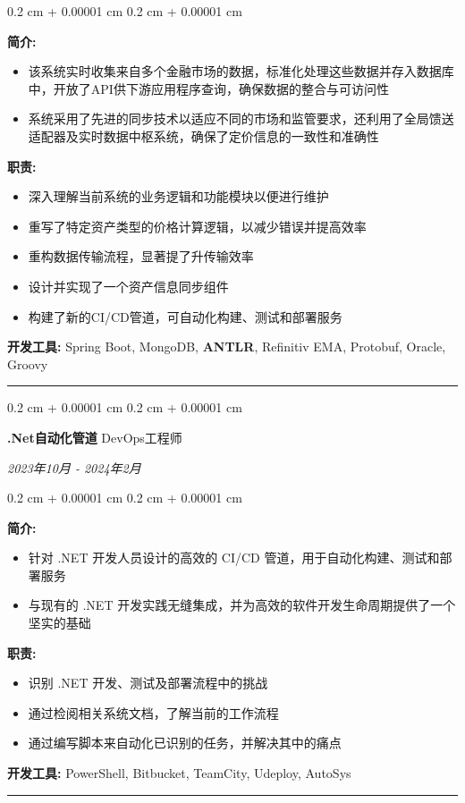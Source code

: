\documentclass[10pt, letterpaper]{article}
\newenvironment{highlights}{
	\begin{itemize}[
		topsep=0.10 cm,
		parsep=0.10 cm,
		partopsep=0pt,
		itemsep=0pt,
		leftmargin=0.4 cm + 10pt
		]
	}{
	\end{itemize}
} %
\newenvironment{onecolentry}{
	\begin{adjustwidth}{
			0.2 cm + 0.00001 cm
		}{
			0.2 cm + 0.00001 cm
		}
	}{
	\end{adjustwidth}
} %
\newenvironment{twocolentry}[2][]{
	\onecolentry
	\def\secondColumn{#2}
	\setcolumnwidth{\fill, 4.5 cm}
	\begin{paracol}{2}
	}{
		\switchcolumn \raggedleft \secondColumn
	\end{paracol}
	\endonecolentry
} %
\begin{document}
		\vspace{0.10 cm}
		\begin{onecolentry}
			\textbf{简介:} 
			\begin{highlights}
				\item{该系统实时收集来自多个金融市场的数据，标准化处理这些数据并存入数据库中，开放了API供下游应用程序查询，确保数据的整合与可访问性}
				\item {系统采用了先进的同步技术以适应不同的市场和监管要求，还利用了全局馈送适配器及实时数据中枢系统，确保了定价信息的一致性和准确性}
			\end{highlights}
 			\textbf{职责:} 
			\begin{highlights}
				\item{深入理解当前系统的业务逻辑和功能模块以便进行维护}
				\item{重写了特定资产类型的价格计算逻辑，以减少错误并提高效率}
				\item{重构数据传输流程，显著提了升传输效率}
				\item{设计并实现了一个资产信息同步组件}
				\item{构建了新的CI/CD管道，可自动化构建、测试和部署服务}
			\end{highlights}
			\textbf{开发工具:} Spring Boot, MongoDB, \textbf{ANTLR}, Refinitiv EMA, Protobuf, Oracle, Groovy
		\end{onecolentry}		
		\vspace{0.4 cm}
		\hrule
		\vspace{0.4 cm}
		\begin{twocolentry}{
				\textit{2023年10月 - 2024年2月}}
				\textbf{.Net自动化管道}
				\space\space\space\space\space\space\space\space\space\space\space\space DevOps工程师
			\end{twocolentry}
			
			\vspace{0.10 cm}
			\begin{onecolentry}
				\textbf{简介:} 
				\begin{highlights}
					\item{针对 .NET 开发人员设计的高效的 CI/CD 管道，用于自动化构建、测试和部署服务}
					\item{与现有的 .NET 开发实践无缝集成，并为高效的软件开发生命周期提供了一个坚实的基础}
				\end{highlights}
				\textbf{职责:} 
				\begin{highlights}
					\item{识别 .NET 开发、测试及部署流程中的挑战}
					\item{通过检阅相关系统文档，了解当前的工作流程}
					\item{通过编写脚本来自动化已识别的任务，并解决其中的痛点}
				\end{highlights}
				\textbf{开发工具:} PowerShell, Bitbucket, TeamCity, Udeploy, AutoSys
			\end{onecolentry}
			\vspace{0.4 cm}
			\hrule
			
\end{document}
